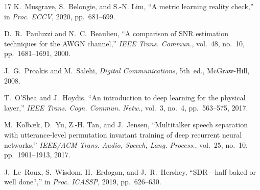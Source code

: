 \documentclass[journal,letterpaper]{IEEEtran}
\begin{document}
\begin{thebibliography}{17}
K.~Musgrave, S.~Belongie, and S.-N. Lim,
``A metric learning reality check,''
in \emph{Proc. ECCV}, 2020, pp.~681--699.

D.~R.~Pauluzzi and N.~C.~Beaulieu,
``A comparison of SNR estimation techniques for the AWGN channel,''
\emph{IEEE Trans. Commun.}, vol.~48, no.~10, pp.~1681--1691, 2000.

J.~G.~Proakis and M.~Salehi,
\emph{Digital Communications}, 5th~ed., McGraw-Hill, 2008.

T.~O'Shea and J.~Hoydis,
``An introduction to deep learning for the physical layer,''
\emph{IEEE Trans. Cogn. Commun. Netw.}, vol.~3, no.~4, pp.~563--575,
2017.

M.~Kolb{\ae}k, D.~Yu, Z.-H. Tan, and J.~Jensen,
``Multitalker speech separation with utterance-level permutation
invariant training of deep recurrent neural networks,''
\emph{IEEE/ACM Trans. Audio, Speech, Lang. Process.}, vol.~25, no.~10,
pp.~1901--1913, 2017.

J.~Le~Roux, S.~Wisdom, H.~Erdogan, and J.~R.~Hershey,
``SDR---half-baked or well done?,''
in \emph{Proc. ICASSP}, 2019, pp.~626--630.

\end{thebibliography}
\end{document}
